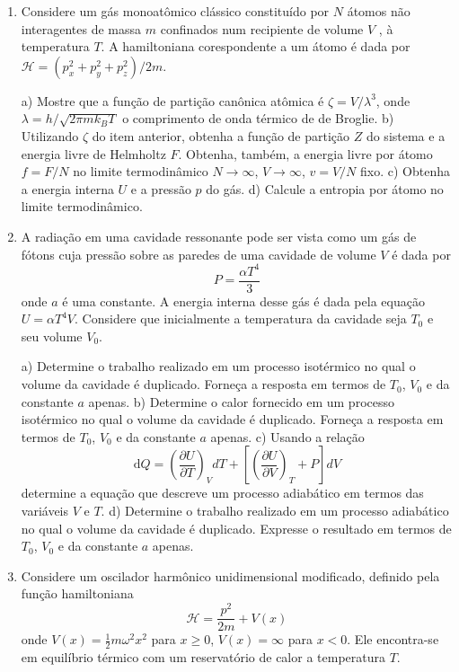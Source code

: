 \begin{enumerate}[start=1,label={\bfseries Q\arabic*.}]
\item Considere um gás monoatômico clássico constituído por $N$ átomos não interagentes de massa $m$ confinados num recipiente de volume $V$ , à temperatura $T$. A hamiltoniana corespondente a um átomo é dada por $\mathcal{H} = \left( p_{x}^{2} + p_{y}^{2} + p_{z}^{2} \right) / 2m$.


  a) Mostre que a função de partição canônica atômica é  $\zeta=V / \lambda^{3}$, onde $\lambda=h / \sqrt{2 \pi m k_{B} T}$ o comprimento de onda térmico de de Broglie.
  b) Utilizando $\zeta$ do item anterior, obtenha a função de partição $Z$ do sistema e a energia livre de Helmholtz $F$. Obtenha, também, a energia livre por átomo $f = F/N$ no limite termodinâmico $N \rightarrow \infty$, $V \rightarrow \infty$, $v = V/N$ fixo.
  c) Obtenha a energia interna $U$ e a pressão $p$ do gás.
  d) Calcule a entropia por átomo no limite termodinâmico.




\item A radiação em uma cavidade ressonante pode ser vista como um gás de fótons cuja pressão sobre as paredes de uma cavidade de volume $V$ é dada por
$$
P = \frac{\alpha T^{4}}{3}
$$
onde $a$ é uma constante. A energia interna desse gás é dada pela equação $U = \alpha T^{4} V$. Considere que inicialmente a temperatura da cavidade seja $T_{0}$ e seu volume $V_{0}$.


a) Determine o trabalho realizado em um processo isotérmico no qual o volume da cavidade é duplicado. Forneça a resposta em termos de $T_{0}$, $V_{0}$ e da constante $a$ apenas.
b) Determine o calor fornecido em um processo isotérmico no qual o volume da cavidade é duplicado. Forneça a resposta em termos de $T_{0}$, $V_{0}$ e da constante $a$ apenas.
c) Usando a relação
$$
\mathrm{d} Q=\left(\frac{\partial U}{\partial T}\right)_{V} d T+\left[\left(\frac{\partial U}{\partial V}\right)_{T}+P\right] d V
$$
determine a equação que descreve um processo adiabático em termos das variáveis $V$ e $T$.
d) Determine o trabalho realizado em um processo adiabático no qual o volume da cavidade é duplicado. Expresse o resultado em termos de $T_{0}$, $V_{0}$ e da constante $a$ apenas.




\item Considere um oscilador harmônico unidimensional modificado, definido pela função hamiltoniana
$$
\mathscr{H}=\frac{p^{2}}{2 m}+V(x)
$$
onde $V(x)=\frac{1}{2} m \omega^{2} x^{2}$ para $x \geq 0$, $V(x)=\infty$  para $x<0$. Ele encontra-se em equilíbrio térmico com um reservatório de calor a temperatura $T$.



\end{enumerate}
